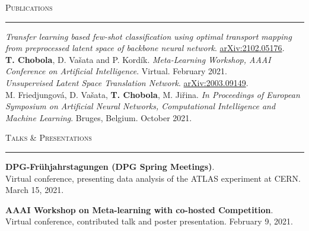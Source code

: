 \documentclass[10pt]{article}
\begin{document}

\begin{Large}
    \textsc{Publications}
    \vspace{0.4em}
    \hrule
    \vspace{0.4em}
\end{Large}
\begin{normalsize}
    \textit{Transfer learning based few-shot classification using optimal transport mapping from preprocessed latent space of backbone neural network}. \href{https://arxiv.org/abs/2102.05176}{arXiv:2102.05176}.\\
    \textbf{T. Chobola}, D. Vašata and P. Kordík. \textit{Meta-Learning Workshop,  AAAI Conference on Artificial Intelligence}. Virtual. February 2021.\\
    
   \textit{Unsupervised Latent Space Translation Network}. \href{https://arxiv.org/abs/2003.09149}{arXiv:2003.09149}.\\
   M. Friedjungová, D. Vašata, \textbf{T. Chobola}, M. Jiřina. \textit{In Proceedings of  European Symposium on Artificial Neural Networks, Computational Intelligence and Machine Learning}. Bruges, Belgium. October 2021.\\
\end{normalsize}

\begin{Large}
    \textsc{Talks \& Presentations}
    \vspace{0.4em}
    \hrule
    \vspace{0.4em}
\end{Large}

\begin{normalsize}
    \textbf{DPG-Frühjahrstagungen (DPG Spring Meetings)}.\\
    Virtual conference, presenting data analysis of the ATLAS experiment at CERN. March 15, 2021.\\
\end{normalsize}

\begin{normalsize}
    \textbf{AAAI Workshop on Meta-learning with co-hosted Competition}.\\
    Virtual conference, contributed talk and poster presentation. February 9, 2021.\\
\end{normalsize}
\newpage
\end{document}
